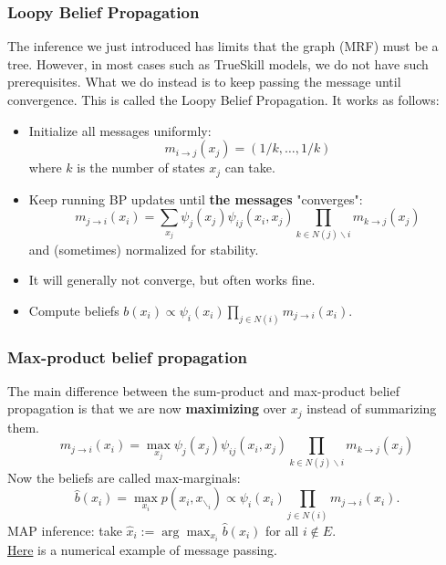 \subsubsection*{Loopy Belief Propagation}
The inference we just introduced has limits that the graph (MRF) must be a tree. However, in most cases such as TrueSkill models, we do not have such prerequisites. What we do instead is to keep passing the message until convergence. This is called the Loopy Belief Propagation. It works as follows:
\begin{itemize}
    \item Initialize all messages uniformly:
    $$
    m_{i \rightarrow j}\left(x_j\right)=(1 / k, \ldots, 1 / k)
    $$
    where $k$ is the number of states $x_j$ can take.
    \item Keep running BP updates until \textbf{the messages} "converges":
    $$
    m_{j \rightarrow i}\left(x_i\right)=\sum_{x_j} \psi_j\left(x_j\right) \psi_{i j}\left(x_i, x_j\right) \prod_{k \in N(j) \backslash i} m_{k \rightarrow j}\left(x_j\right)
    $$
    and (sometimes) normalized for stability.
    \item It will generally not converge, but often works fine.
    \item Compute beliefs $b\left(x_i\right) \propto \psi_i\left(x_i\right) \prod_{j \in N(i)} m_{j \rightarrow i}\left(x_i\right)$.
\end{itemize}
\subsubsection*{Max-product belief propagation}
The main difference between the sum-product and max-product belief propagation is that we are now \textbf{maximizing} over $x_j$ instead of summarizing them.\\
$$
m_{j \rightarrow i}\left(x_i\right)=\max _{x_j} \psi_j\left(x_j\right) \psi_{i j}\left(x_i, x_j\right) \prod_{k \in N(j) \backslash i} m_{k \rightarrow j}\left(x_j\right)
$$
Now the beliefs are called max-marginals:
$$
\hat{b}\left(x_i\right)=\max _{x_i} p\left(x_i, x_{\backslash_i}\right) \propto \psi_i\left(x_i\right) \prod_{j \in N(i)} m_{j \rightarrow i}\left(x_i\right) .
$$
MAP inference: take $\hat{x}_i:=\arg \max _{x_i} \hat{b}\left(x_i\right)$ for all $i \notin E$.\\
\hyperref[example-3]{Here} is a numerical example of message passing.